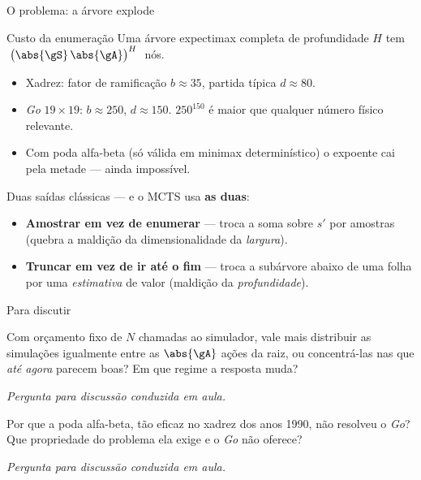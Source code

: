 \documentclass[aspectratio=169, 11pt]{beamer}
\newcommand{\paradiscussao}{\smallskip
  {\footnotesize\color{rlCinza}\itshape Pergunta para discussão conduzida em aula.}}
\begin{document}
\begin{frame}{O problema: a árvore explode}
  \begin{teobox}{Custo da enumeração}
    Uma árvore expectimax completa de profundidade $H$ tem
    $\;\bigl(\abs{\gS}\,\abs{\gA}\bigr)^{H}\;$ nós.
  \end{teobox}

  \pause
  \begin{itemize}
    \item Xadrez: fator de ramificação $b \approx 35$, partida típica
          $d \approx 80$.
    \item \emph{Go} $19\times19$: $b \approx 250$, $d \approx 150$.
          $250^{150}$ é maior que qualquer número físico relevante.
    \item Com poda alfa-beta (só válida em minimax determinístico) o expoente
          cai pela metade --- ainda impossível.
  \end{itemize}

  \pause
  \begin{ideiabox}
    Duas saídas clássicas --- e o MCTS usa \textbf{as duas}:
    \begin{itemize}\setlength{\itemsep}{0.2ex}
      \item \textbf{Amostrar em vez de enumerar} --- troca a soma sobre $s'$ por
            amostras (quebra a maldição da dimensionalidade da \emph{largura}).
      \item \textbf{Truncar em vez de ir até o fim} --- troca a subárvore abaixo
            de uma folha por uma \emph{estimativa} de valor (maldição da
            \emph{profundidade}).
    \end{itemize}
  \end{ideiabox}
\end{frame}

\begin{frame}{Para discutir}
  \begin{quizbox}{}
    Com orçamento fixo de $N$ chamadas ao simulador, vale mais distribuir as
    simulações igualmente entre as $\abs{\gA}$ ações da raiz, ou concentrá-las
    nas que \emph{até agora} parecem boas? Em que regime a resposta muda?
  \end{quizbox}
  \paradiscussao

  \pause
  \vfill
  \begin{quizbox}{}
    Por que a poda alfa-beta, tão eficaz no xadrez dos anos 1990, não resolveu
    o \emph{Go}? Que propriedade do problema ela exige e o \emph{Go} não oferece?
  \end{quizbox}
  \paradiscussao
\end{frame}
\end{document}
